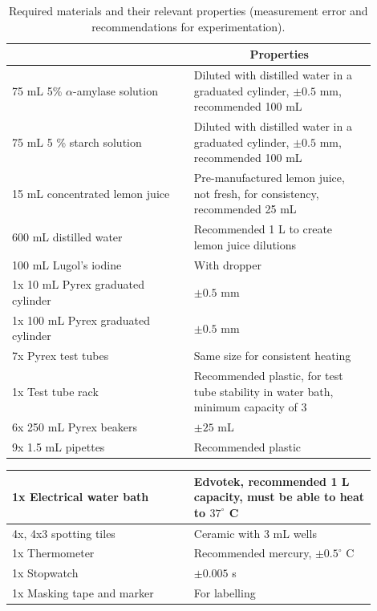 \documentclass[12pt]{article}
\begin{document}
\begin{table}[H]
\centering
\caption{Required materials and their relevant properties (measurement error and recommendations for experimentation).}
\begin{tabular}{|p{0.45\linewidth}|p{0.45\linewidth}|}
\hline
\rowcolor[HTML]{C0C0C0} 
    \multicolumn{1}{|c|}{Material} 
    & \multicolumn{1}{|c|}{Properties} \\ 
\hline
    75 mL 5\% $\alpha$-amylase solution
    & Diluted with distilled water in a graduated cylinder, $\pm 0.5$ mm, recommended 100 mL  \\ 
    \hline
    75 mL 5 \% starch solution 
    & Diluted with distilled water in a graduated cylinder, $\pm 0.5$ mm, recommended 100 mL \\
    \hline
    15 mL concentrated lemon juice
    & Pre-manufactured lemon juice, not fresh, for consistency, recommended 25 mL \\ 
    \hline
    600 mL distilled water
    & Recommended 1 L to create lemon juice dilutions \\ 
    \hline
    100 mL Lugol's iodine
    & With dropper \\ 
    \hline
    1x 10 mL Pyrex graduated cylinder
    & $\pm 0.5$ mm \\ 
    \hline
    1x 100 mL Pyrex graduated cylinder
    & $\pm 0.5$ mm \\ 
    \hline
    7x Pyrex test tubes
    & Same size for consistent heating \\ 
    \hline
    1x Test tube rack
    & Recommended plastic, for test tube stability in water bath, minimum capacity of 3 \\ 
    \hline
    6x 250 mL Pyrex beakers
    & $\pm 25$ mL \\ 
    \hline
    9x 1.5 mL pipettes
    & Recommended plastic \\ 
\hline
\end{tabular}
\end{table}
\begin{table}[H]
\centering
\begin{tabular}{|p{0.45\linewidth}|p{0.45\linewidth}|}
\hline
    1x Electrical water bath
    & Edvotek, recommended 1 L capacity, must be able to heat to $37^\circ$ C \\ 
    \hline
    4x, 4x3 spotting tiles
    & Ceramic with 3 mL wells \\ 
    \hline
    1x Thermometer
    & Recommended mercury, $\pm 0.5^\circ$ C\\ 
    \hline
    1x Stopwatch
    & $\pm 0.005$ s\\ 
    \hline
    1x Masking tape and marker
    & For labelling \\ 
    \hline
\end{tabular}
\end{table}
\end{document}

